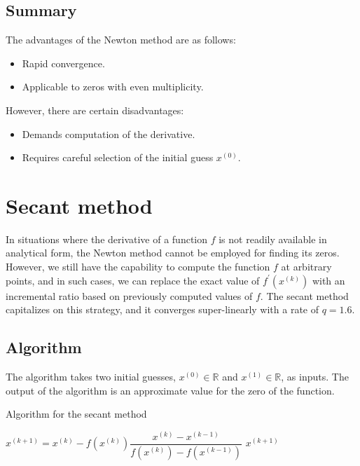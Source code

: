 \documentclass[12pt, a4paper]{report}
\begin{document}
    \subsection{Summary}
    The advantages of the Newton method are as follows:
    \begin{itemize}
        \item Rapid convergence. 
        \item Applicable to zeros with even multiplicity.
    \end{itemize}
    However, there are certain disadvantages:
    \begin{itemize}
        \item Demands computation of the derivative.
        \item Requires careful selection of the initial guess $x^{(0)}$. 
    \end{itemize}

    \section{Secant method}
    In situations where the derivative of a function $f$ is not readily available in analytical form, the Newton method cannot be employed for finding its zeros. 
    However, we still have the capability to compute the function $f$ at arbitrary points, and in such cases, we can replace the exact value of $f^{'}(x^{(k)})$ with an incremental ratio based on previously computed values of $f$. 
    The secant method capitalizes on this strategy, and it converges super-linearly with a rate of $q=1.6$. 

    \subsection{Algorithm}
    The algorithm takes two initial guesses, $x^{(0)} \in \mathbb{R}$ and $x^{(1)} \in \mathbb{R}$, as inputs. 
    The output of the algorithm is an approximate value for the zero of the function.
    \begin{algorithm}[H]
        \caption{Algorithm for the secant method}
            \begin{algorithmic}[1]
                    \State $x^{(k+1)}=x^{(k)}-f(x^{(k)})\dfrac{x^{(k)}-x^{(k-1)}}{f(x^{(k)})-f(x^{(k-1)})}$
                        \State \Return $x^{(k+1)}$
                    \EndIf
                \EndFor
            \end{algorithmic}
    \end{algorithm}
\end{document}
